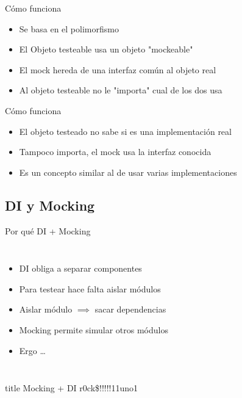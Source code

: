 \begin{frame}[t]{C\'omo funciona}
\begin{itemize}
	\item Se basa en el polimorfismo
	\item El Objeto testeable usa un objeto "mockeable"
	\item El mock hereda de una interfaz com\'un al objeto real
	\item Al objeto testeable no le "importa" cual de los dos usa
\end{itemize}
\bigskip
\begin{center}
\end{center}
\end{frame}

\begin{frame}[t]{C\'omo funciona}
\begin{itemize}
	\item El objeto testeado no sabe si es una implementaci\'on real
	\item Tampoco importa, el mock usa la interfaz conocida
	\item Es un concepto similar al de usar varias implementaciones
\end{itemize}
\bigskip
\begin{center}
\end{center}
\end{frame}

\subsection{DI y Mocking}
\begin{frame}[t]{Por qu\'e DI + Mocking}
\bigskip

\begin{columns}[onlytextwidth]
	\begin{itemize}
		\item DI obliga a separar componentes
		\item Para testear hace falta aislar m\'odulos
		\item Aislar m\'odulo $\implies$ sacar dependencias
		\item Mocking permite simular otros m\'odulos

		\item Ergo \ldots
	\end{itemize}
	\begin{flushright}
	\end{flushright}
\end{columns}
\bigskip
\bigskip
\begin{beamercolorbox}[sep=.1cm,shadow=true,rounded=true,center]{title}
	Mocking + DI r0ck\$!!!!!11uno1
\end{beamercolorbox}
\end{frame}

